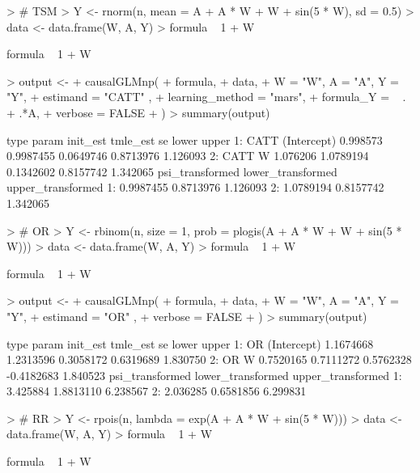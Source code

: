\documentclass{article}
\begin{document}
\begin{Schunk}
\begin{Sinput}
> # TSM
> Y <- rnorm(n, mean = A + A * W + W + sin(5 * W), sd = 0.5)
> data <- data.frame(W, A, Y)
> formula ~ 1 + W
\end{Sinput}
\begin{Soutput}
formula ~ 1 + W
\end{Soutput}
\begin{Sinput}
> output <-
+   causalGLMnp(
+     formula,
+     data,
+     W = "W", A = "A", Y = "Y",
+     estimand = "CATT" ,
+     learning_method = "mars",
+     formula_Y = ~ . + .*A,
+     verbose = FALSE
+   )
> summary(output)
\end{Sinput}
\begin{Soutput}
   type       param init_est  tmle_est        se     lower    upper
1: CATT (Intercept) 0.998573 0.9987455 0.0649746 0.8713976 1.126093
2: CATT           W 1.076206 1.0789194 0.1342602 0.8157742 1.342065
   psi_transformed lower_transformed upper_transformed
1:       0.9987455         0.8713976          1.126093
2:       1.0789194         0.8157742          1.342065
\end{Soutput}
\begin{Sinput}
> # OR
> Y <- rbinom(n, size =  1, prob = plogis(A + A * W + W + sin(5 * W)))
> data <- data.frame(W, A, Y)
> formula ~ 1 + W
\end{Sinput}
\begin{Soutput}
formula ~ 1 + W
\end{Soutput}
\begin{Sinput}
> output <-
+   causalGLMnp(
+     formula,
+     data,
+     W = "W", A = "A", Y = "Y",
+     estimand = "OR" ,
+     verbose = FALSE
+   )
> summary(output)
\end{Sinput}
\begin{Soutput}
   type       param  init_est  tmle_est        se      lower    upper
1:   OR (Intercept) 1.1674668 1.2313596 0.3058172  0.6319689 1.830750
2:   OR           W 0.7520165 0.7111272 0.5762328 -0.4182683 1.840523
   psi_transformed lower_transformed upper_transformed
1:        3.425884         1.8813110          6.238567
2:        2.036285         0.6581856          6.299831
\end{Soutput}
\begin{Sinput}
> # RR
> Y <- rpois(n, lambda = exp(A + A * W + sin(5 * W)))
> data <- data.frame(W, A, Y)
> formula ~ 1 + W
\end{Sinput}
\begin{Soutput}
formula ~ 1 + W
\end{Soutput}
\begin{Sinput}

\end{Sinput}
\end{Schunk}
\end{document}
